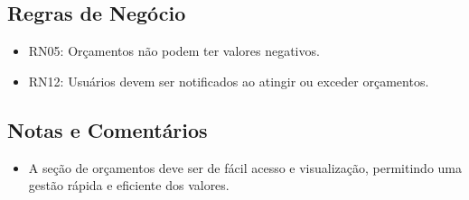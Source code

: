 \subsection*{Regras de Negócio}
\begin{addmargin}[1.5cm]{0cm}
    \begin{itemize}
        \item RN05: Orçamentos não podem ter valores negativos.
        \item RN12: Usuários devem ser notificados ao atingir ou exceder orçamentos.
    \end{itemize}
\end{addmargin}

\subsection*{Notas e Comentários}
\begin{addmargin}[1.5cm]{0cm}
    \begin{itemize}
        \item A seção de orçamentos deve ser de fácil acesso e visualização, permitindo uma gestão rápida e eficiente dos valores.
    \end{itemize}
\end{addmargin}
